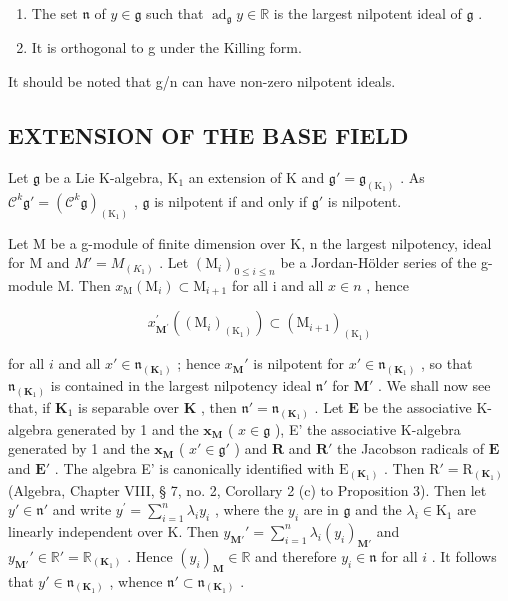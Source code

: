 \begin{enumerate}
\def\labelenumi{(\alph{enumi})}
\item
  The set \(\mathfrak{n}\) of \(y\in \mathfrak{g}\) such that \(\operatorname {ad}_{\mathfrak{g}}y\in \mathbb{R}\) is the largest nilpotent ideal of \(\mathfrak{g}\) .
\item
  It is orthogonal to g under the Killing form.
\end{enumerate}

It should be noted that g/n can have non-zero nilpotent ideals.

\subsection{EXTENSION OF THE BASE FIELD}

Let \(\mathfrak{g}\) be a Lie K-algebra, \(\mathrm{K}_1\) an extension of K and \(\mathfrak{g}' = \mathfrak{g}_{(\mathrm{K}_1)}\) . As \(\mathcal{C}^k\mathfrak{g}' = (\mathcal{C}^k\mathfrak{g})_{(\mathrm{K}_1)}\) , \(\mathfrak{g}\) is nilpotent if and only if \(\mathfrak{g}'\) is nilpotent.

Let M be a g-module of finite dimension over K, n the largest nilpotency, ideal for M and \(M' = M_{(K_1)}\) . Let \((\mathrm{M}_i)_{0 \leq i \leq n}\) be a Jordan-Hölder series of the g-module M. Then \(x_{\mathrm{M}}(\mathrm{M}_i) \subset \mathrm{M}_{i+1}\) for all i and all \(x \in n\) , hence

\[
x _ {\mathbf {M} ^ {\prime}} ^ {\prime} \left(\left(\mathrm{M} _ {i}\right) _ {\left(\mathrm{K} _ {1}\right)}\right) \subset \left(\mathrm{M} _ {i + 1}\right) _ {\left(\mathrm{K} _ {1}\right)}
\]

for all \(i\) and all \(x' \in \mathfrak{n}_{(\mathbf{K}_1)}\) ; hence \(x_{\mathbf{M}}'\) is nilpotent for \(x' \in \mathfrak{n}_{(\mathbf{K}_1)}\) , so that \(\mathfrak{n}_{(\mathbf{K}_1)}\) is contained in the largest nilpotency ideal \(\mathfrak{n}'\) for \(\mathbf{M}'\) . We shall now see that, if \(\mathbf{K}_1\) is separable over \(\mathbf{K}\) , then \(\mathfrak{n}' = \mathfrak{n}_{(\mathbf{K}_1)}\) . Let \(\mathbf{E}\) be the associative K-algebra generated by 1 and the \(\mathbf{x}_{\mathbf{M}}\) ( \(x \in \mathfrak{g}\) ), E' the associative K-algebra generated by 1 and the \(\mathbf{x}_{\mathbf{M}}\) ( \(x' \in \mathfrak{g}'\) ) and \(\mathbf{R}\) and \(\mathbf{R}'\) the Jacobson radicals of \(\mathbf{E}\) and \(\mathbf{E}'\) . The algebra E' is canonically identified with \(\mathrm{E}_{(\mathbf{K}_1)}\) . Then \(\mathrm{R}' = \mathrm{R}_{(\mathbf{K}_1)}\) (Algebra, Chapter VIII, § 7, no. 2, Corollary 2 (c) to Proposition 3). Then let \(y' \in \mathfrak{n}'\) and write \(y^{\prime} = \sum_{i = 1}^{n}\lambda_{i}y_{i}\) , where the \(y_{i}\) are in \(\mathfrak{g}\) and the \(\lambda_{i}\in \mathrm{K}_{1}\) are linearly independent over K. Then \(y_{\mathbf{M}'}' = \sum_{i=1}^{n} \lambda_i(y_i)_{\mathbf{M}'}\) and \(y_{\mathbf{M}'}' \in \mathbb{R}' = \mathbb{R}_{(\mathbf{K}_1)}\) . Hence \((y_i)_{\mathbf{M}} \in \mathbb{R}\) and therefore \(y_i \in \mathfrak{n}\) for all \(i\) . It follows that \(y' \in \mathfrak{n}_{(\mathbf{K}_1)}\) , whence \(\mathfrak{n}' \subset \mathfrak{n}_{(\mathbf{K}_1)}\) .

